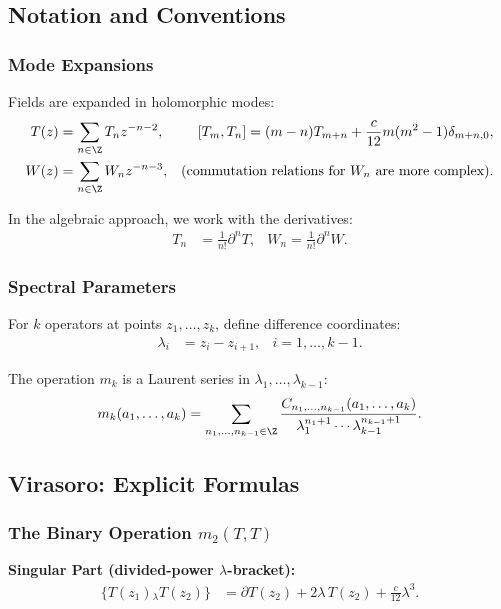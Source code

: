 \subsection{Notation and Conventions}

\subsubsection{Mode Expansions}

Fields are expanded in holomorphic modes:
\begin{align}
T(z) &= \sum_{n \in \Z} T_n z^{-n-2}, & [T_m, T_n] = (m-n)T_{m+n} + \frac{c}{12}m(m^2-1)\delta_{m+n,0},\\
W(z) &= \sum_{n \in \Z} W_n z^{-n-3}, & (\text{commutation relations for } W_n \text{ are more complex}).
\end{align}

In the algebraic approach, we work with the derivatives:
\begin{align}
T_n &= \frac{1}{n!} \partial^n T, & W_n = \frac{1}{n!} \partial^n W.
\end{align}

\subsubsection{Spectral Parameters}

For $k$ operators at points $z_1, \ldots, z_k$, define difference coordinates:
\begin{align}
\lambda_i &= z_i - z_{i+1}, & i = 1, \ldots, k-1.
\end{align}

The operation $m_k$ is a Laurent series in $\lambda_1, \ldots, \lambda_{k-1}$:
\begin{equation}
m_k(a_1, \ldots, a_k) = \sum_{n_1, \ldots, n_{k-1} \in \Z} \frac{C_{n_1, \ldots, n_{k-1}}(a_1, \ldots, a_k)}{\lambda_1^{n_1+1} \cdots \lambda_{k-1}^{n_{k-1}+1}}.
\end{equation}

\subsection{Virasoro: Explicit Formulas}

\subsubsection{The Binary Operation $m_2(T,T)$}

\textbf{Singular Part (divided-power $\lambda$-bracket):}
\begin{align}
\{T(z_1) {}_\lambda T(z_2)\} &= \partial T(z_2) + 2\lambda\,T(z_2) + \frac{c}{12}\lambda^3.
\end{align}

